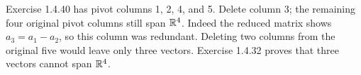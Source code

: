 Exercise 1.4.40 has pivot columns 1, 2, 4, and 5. Delete column 3;
the remaining four original pivot columns still span $\mathbb{R}^4$.
Indeed the reduced matrix shows $a_3=a_1-a_2$, so this column was
redundant. Deleting two columns from the original five would leave
only three vectors. Exercise 1.4.32 proves that three vectors cannot
span $\mathbb{R}^4$.
